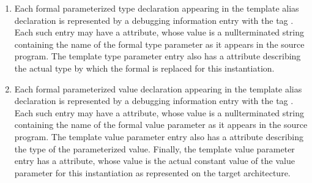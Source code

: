 \begin{enumerate}[1.]
\item Each formal parameterized type declaration appearing
in the template alias declaration is represented
by a debugging information entry with the tag
. 
Each such entry may have
a  attribute,
whose value is a null\dash terminated
string containing the name of the formal type parameter as it
appears in the source program. The template type parameter
entry also has 
a  attribute
describing the actual
type by which the formal is replaced for this instantiation.

\item Each formal parameterized value declaration
appearing in the template alias declaration is
represented by a debugging information entry with the tag
. 
Each such entry may have
a  attribute,
whose value is a null\dash terminated
string containing the name of the formal value parameter
as it appears in the source program. The template value
parameter entry also has 
a  attribute describing
the type of the parameterized value. Finally, the template
value parameter entry has a  
attribute, whose value is the actual constant value of the value parameter for
this instantiation as represented on the target architecture.
\end{enumerate}

